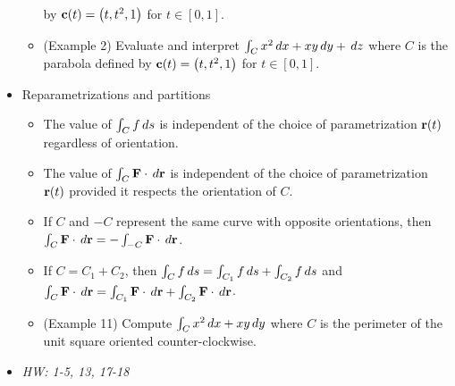 \documentclass[11pt]{article}
\begin{document}
\begin{itemize}
\begin{itemize}
            by \(\mathbf{c}(t)=\left(t,t^2,1\right)\) for \(t\in[0,1]\).
      \item (Example 2) Evaluate and interpret
            \(\int_C x^2\,d x+xy\,d y+\,d z\) where \(C\) is the
            parabola defined
            by \(\mathbf{c}(t)=\left(t,t^2,1\right)\) for \(t\in[0,1]\).
    \end{itemize}
  \item Reparametrizations and partitions
    \begin{itemize}
      \item The value of \(\int_C f\,d s\)
            is independent of the choice of parametrization \(\mathbf{r}(t)\)
            regardless of orientation.
      \item The value of \(\int_C \mathbf{F}\cdot\,d \mathbf{r}\)
            is independent of the choice of parametrization \(\mathbf{r}(t)\)
            provided it respects the orientation of \(C\).
      \item If \(C\) and \(-C\) represent the same curve with opposite
            orientations, then
            \(\int_C \mathbf{F}\cdot\,d\mathbf{r}=-\int_{-C}\mathbf{F}\cdot\,d\mathbf{r}\).
      \item If \(C=C_1+C_2\), then
            \(\int_C f\,d s=\int_{C_1}f\,d s+\int_{C_2}f\,d s\) and
            \(
              \int_C \mathbf{F}\cdot\,d \mathbf{r}
                =
              \int_{C_1}\mathbf{F}\cdot\,d \mathbf{r}+\int_{C_2}\mathbf{F}\cdot\,d \mathbf{r}
            \).
      \item (Example 11) Compute \(\int_C x^2\,d x+xy\,d y\) where
            \(C\) is the perimeter of the unit square oriented counter-clockwise.
    \end{itemize}
  \item\textit{
    HW: 1-5, 13, 17-18
  }
\end{itemize}



\end{document}

